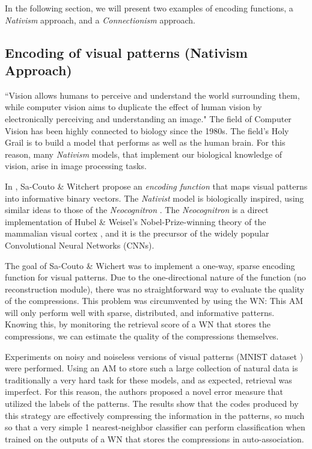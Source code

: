 \documentclass{article}
\begin{document}
In the following section, we will present two examples of encoding functions, a \textit{Nativism} approach, and a \textit{Connectionism} approach.

\subsection{Encoding of visual patterns (Nativism Approach)}
``Vision allows humans to perceive and understand the world surrounding them, while computer vision aims to duplicate the effect of human vision by electronically perceiving and understanding an image." \cite{sonka2014image}
The field of Computer Vision has been highly connected to biology \cite{marr1982vision} since the 1980s. The field's Holy Grail is to build a model that performs as well as the human brain. For this reason, many \textit{Nativism} models, that implement our biological knowledge of vision, arise in image processing tasks.

In \cite{sa2020storing}, Sa-Couto \& Witchert propose an \textit{encoding function} that maps visual patterns into informative binary vectors. The \textit{Nativist} model is biologically inspired, using similar ideas to those of the \textit{Neocognitron} \cite{fukushima1988neocognitron}. The \textit{Neocognitron} is a direct implementation of Hubel \& Weisel's Nobel-Prize-winning theory of the mammalian visual cortex \cite{hubel1962receptive}, and it is the precursor of the widely popular Convolutional Neural Networks (CNNs).

The goal of Sa-Couto \& Wichert was to implement a one-way, sparse encoding function for visual patterns. Due to the one-directional nature of the function (no reconstruction module), there was no straightforward way to evaluate the quality of the compressions. This problem was circumvented by using the WN: This AM will only perform well with sparse, distributed, and informative patterns. Knowing this, by monitoring the retrieval score of a WN that stores the compressions, we can estimate the quality of the compressions themselves.

Experiments on noisy and noiseless versions of visual patterns (MNIST dataset \cite{lecun1998mnist}) were performed. Using an AM to store such a large collection of natural data is traditionally a very hard task for these models, and as expected, retrieval was imperfect. For this reason, the authors proposed a novel error measure that utilized the labels of the patterns. The results show that the codes produced by this strategy are effectively compressing the information in the patterns, so much so that a very simple 1 nearest-neighbor classifier can perform classification when trained on the outputs of a WN that stores the compressions in auto-association.
\end{document}
